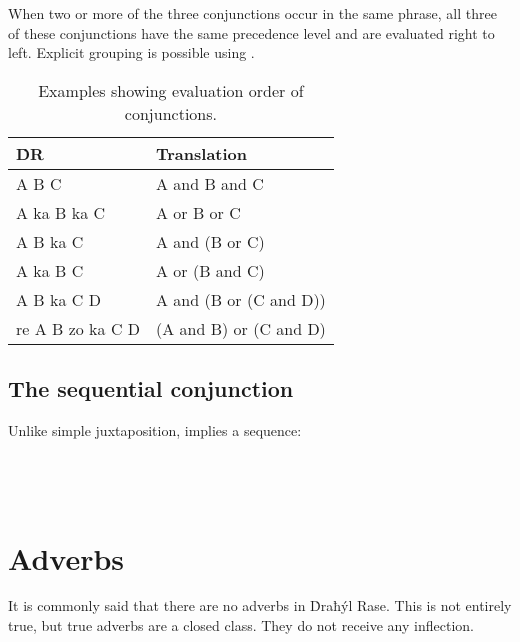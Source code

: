 \documentclass{book}
\begin{document}
When two or more of the three conjunctions occur in the same phrase, all three of these conjunctions have the same precedence level and are evaluated right to left. Explicit grouping is possible using .

\begin{table}[ht]
    \caption{Examples showing evaluation order of conjunctions.}
    \centering
    \begin{tabular}{|l|l|}
        \hline
        ḊR & Translation \\
        \hline
        A B C & A and B and C \\
        A ka B ka C & A or B or C \\
        A B ka C & A and (B or C) \\
        A ka B C & A or (B and C) \\
        A B ka C D & A and (B or (C and D)) \\
        re A B zo ka C D & (A and B) or (C and D) \\
        \hline
    \end{tabular}
\end{table}

\section{The sequential conjunction }

Unlike simple juxtaposition,  implies a sequence: \\
~\\
    \\
    \\
\emph{   }

\chapter{Adverbs}

It is commonly said that there are no adverbs in Ḋraħýl Rase. This is not entirely true, but true adverbs are a closed class. They do not receive any inflection.
\end{document}
